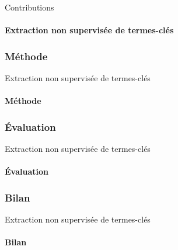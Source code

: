 \begin{frame}{Contributions}\framesubtitle{Extraction non supervisée de termes-clés}
\end{frame}

\subsubsection{Méthode}
  \begin{frame}{Extraction non supervisée de termes-clés}\framesubtitle{Méthode}
  \end{frame}

\subsubsection{Évaluation}
  \begin{frame}{Extraction non supervisée de termes-clés}\framesubtitle{Évaluation}
  \end{frame}

\subsubsection{Bilan}
  \begin{frame}{Extraction non supervisée de termes-clés}\framesubtitle{Bilan}
  \end{frame}

